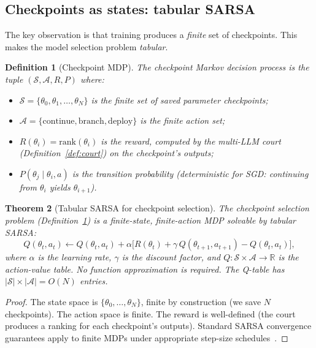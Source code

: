 \documentclass[11pt,a4paper]{article}
\newtheorem{theorem}{Theorem}[section]
\newtheorem{definition}[theorem]{Definition}
\newcommand{\R}{\mathbb{R}}
\newcommand{\cS}{\mathcal{S}}
\newcommand{\cA}{\mathcal{A}}
\begin{document}
\subsection{Checkpoints as states: tabular SARSA}

The key observation is that training produces a \emph{finite}
set of checkpoints.
This makes the model selection problem \emph{tabular}.

\begin{definition}[Checkpoint MDP]\label{def:checkpoint-mdp}
The checkpoint Markov decision process is the tuple
$(\cS, \cA, R, P)$ where:
\begin{itemize}[nosep]
\item $\cS = \{\theta_0, \theta_1, \ldots, \theta_N\}$
  is the finite set of saved parameter checkpoints;
\item $\cA = \{\text{continue}, \text{branch}, \text{deploy}\}$
  is the finite action set;
\item $R(\theta_i) = \mathrm{rank}(\theta_i)$ is the reward,
  computed by the multi-LLM court
  (Definition~\ref{def:court}) on the checkpoint's outputs;
\item $P(\theta_j \mid \theta_i, a)$ is the transition
  probability (deterministic for SGD: continuing from
  $\theta_i$ yields $\theta_{i+1}$).
\end{itemize}
\end{definition}

\begin{theorem}[Tabular SARSA for checkpoint selection]\label{thm:sarsa}
The checkpoint selection problem
(Definition~\ref{def:checkpoint-mdp})
is a finite-state, finite-action MDP solvable by
tabular SARSA\@:
\begin{equation}\label{eq:sarsa}
Q(\theta_t, a_t) \leftarrow Q(\theta_t, a_t)
  + \alpha \bigl[R(\theta_t) + \gamma \, Q(\theta_{t+1}, a_{t+1})
  - Q(\theta_t, a_t)\bigr],
\end{equation}
where $\alpha$ is the learning rate, $\gamma$ is the
discount factor, and $Q : \cS \times \cA \to \R$ is the
action-value table.
No function approximation is required.
The Q-table has $|\cS| \times |\cA| = O(N)$ entries.
\end{theorem}

\begin{proof}
The state space is $\{\theta_0, \ldots, \theta_N\}$, finite
by construction (we save $N$ checkpoints).
The action space is finite.
The reward is well-defined (the court produces a ranking
for each checkpoint's outputs).
Standard SARSA convergence guarantees apply to finite MDPs
under appropriate step-size schedules~\cite{SB18}.
\end{proof}
\end{document}
